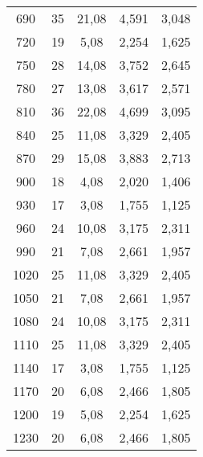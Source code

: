 \begin{table}[H]
\begin{tabular}{| c | c | c  | c| c| }
    690	&   35	  &   21,08 	&4,591	   &  3,048  \\
    720	&   19	  &   5,08 	  &2,254	   &  1,625  \\
    750	&   28	  &   14,08 	&3,752	   &  2,645  \\
    780	&   27	  &   13,08 	&3,617	   &  2,571  \\
    810	&   36	  &   22,08 	&4,699	   &  3,095  \\
    840	&   25	  &   11,08 	&3,329	   &  2,405  \\
    870	&   29	  &   15,08 	&3,883	   &  2,713  \\
    900	&   18	  &   4,08	  &2,020	   &  1,406  \\
    930	&   17	  &   3,08	  &1,755	   &  1,125  \\
    960	&   24	  &   10,08	  &3,175	   &  2,311  \\
    990	&   21	  &   7,08	  &2,661	   &  1,957  \\
    1020&   25	  &   11,08	  &3,329	   &  2,405  \\
    1050& 	21	  &   7,08	  &2,661	   &  1,957  \\
    1080& 	24	  &   10,08	  &3,175	   &  2,311  \\
    1110& 	25	  &   11,08	  &3,329	   &  2,405  \\
    1140& 	17	  &   3,08	  &1,755	   &  1,125  \\
    1170& 	20	  &   6,08	  &2,466	   &  1,805  \\
    1200& 	19	  &   5,08	  &2,254	   &  1,625  \\
    1230& 	20	  &   6,08	  &2,466	   &  1,805  \\ 
      
    \bottomrule
    \end{tabular}
  \end{table}


